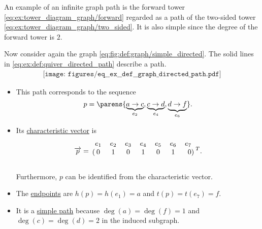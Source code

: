 \begin{example}\label{ex:def:quiver_directed_path}
  An example of an infinite graph path is the forward tower \eqref{eq:ex:tower_diagram_graph/forward} regarded as a path of the two-sided tower \eqref{eq:ex:tower_diagram_graph/two_sided}. It is also simple since the degree of the forward tower is \( 2 \).

  Now consider again the graph \eqref{eq:fig:def:graph/simple_directed}. The solid lines in \eqref{eq:ex:def:quiver_directed_path} describe a path.
  \begin{equation}\label{eq:ex:def:quiver_directed_path}
    \begin{aligned}
      \texttt{[image: figures/eq\_\_ex\_\_def\_\_graph\_directed\_path.pdf]}
    \end{aligned}
  \end{equation}

  \begin{itemize}
    \item This path corresponds to the sequence
    \begin{equation*}
      p = \parens{ \underbrace{a \to c}_{e_2}, \underbrace{c \to d}_{e_4}, \underbrace{d \to f}_{e_6} }.
    \end{equation*}

    \item Its \hyperref[def:quiver_directed_path/characteristic_vector]{characteristic vector} is
    \begin{equation*}
      \vect{p}
      =
      \begin{blockarray}{ccccccr}
        e_1 & e_2 & e_3 & e_4 & e_5 & e_6 & e_7 \\
      \begin{block}{(ccccccr)}
        0   & 1   & 0   & 1   & 0   & 1   & 0   \\
      \end{block}
      \end{blockarray}
      {}^T.
    \end{equation*}

    Furthermore, \( p \) can be identified from the characteristic vector.

    \item The \hyperref[def:quiver_directed_path/endpoints]{endpoints} are \( h(p) = h(e_1) = a \) and \( t(p) = t(e_7) = f \).

    \item It is a \hyperref[def:quiver_adjacency_chain/simple]{simple path} because \( \deg(a) = \deg(f) = 1 \) and \( \deg(c) = \deg(d) = 2 \) in the induced subgraph.


\end{itemize}
\end{example}
